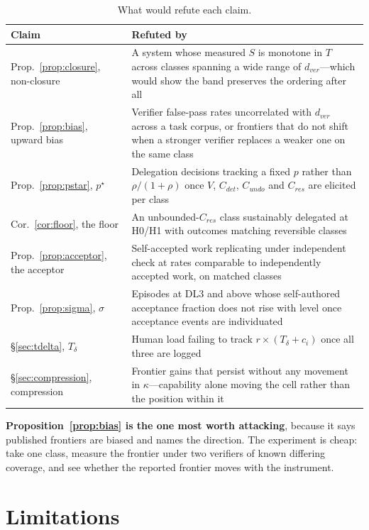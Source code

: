 \documentclass[11pt]{article}
\theoremstyle{definition}
\newcommand{\Td}{\ensuremath{T_\delta}}
\newcommand{\pstar}{\ensuremath{p^{\star}}}
\newcommand{\dver}{\ensuremath{d_{ver}}}
\newcommand{\kap}{\ensuremath{\kappa}}
\begin{document}
\begin{table}[h]
\centering\small
\begin{tabularx}{\textwidth}{@{}lY@{}}
\toprule
Claim & Refuted by \\
\midrule
Prop.~\ref{prop:closure}, non-closure & A system whose measured $S$ is monotone in $T$ across classes spanning a wide range of \dver{}---which would show the band preserves the ordering after all \\
Prop.~\ref{prop:bias}, upward bias & Verifier false-pass rates uncorrelated with \dver{} across a task corpus, or frontiers that do not shift when a stronger verifier replaces a weaker one on the same class \\
Prop.~\ref{prop:pstar}, \pstar{} & Delegation decisions tracking a fixed $p$ rather than $\rho/(1+\rho)$ once $V$, $C_{det}$, $C_{undo}$ and $C_{res}$ are elicited per class \\
Cor.~\ref{cor:floor}, the floor & An unbounded-$C_{res}$ class sustainably delegated at H0/H1 with outcomes matching reversible classes \\
Prop.~\ref{prop:acceptor}, the acceptor & Self-accepted work replicating under independent check at rates comparable to independently accepted work, on matched classes \\
Prop.~\ref{prop:sigma}, $\sigma$ & Episodes at DL3 and above whose self-authored acceptance fraction does not rise with level once acceptance events are individuated \\
\S\ref{sec:tdelta}, \Td{} & Human load failing to track $r\times(\Td+c_i)$ once all three are logged \\
\S\ref{sec:compression}, compression & Frontier gains that persist without any movement in \kap{}---capability alone moving the cell rather than the position within it \\
\bottomrule
\end{tabularx}
\caption{What would refute each claim.}
\end{table}

\textbf{Proposition~\ref{prop:bias} is the one most worth attacking}, because it says published frontiers are biased and names the direction. The experiment is cheap: take one class, measure the frontier under two verifiers of known differing coverage, and see whether the reported frontier moves with the instrument.

\section{Limitations}\label{sec:limits}
\end{document}
